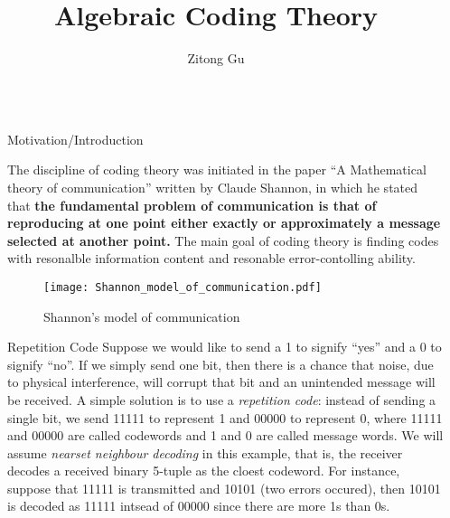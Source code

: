 \documentclass[final]{beamer}
\title{Algebraic Coding Theory}
\author{Zitong Gu}
\institute[shortinst]{McMaster University}
\newlength{\sepwidth}
\newlength{\colwidth}
\newcommand{\separatorcolumn}{\begin{column}{\sepwidth}\end{column}}
\begin{document}
\begin{frame}[t]
\begin{columns}[t]
\separatorcolumn

\begin{column}{\colwidth}

  \begin{block}{Motivation/Introduction}

    The discipline of coding theory was initiated in the paper 
    ``A Mathematical theory of communication'' written by 
    Claude Shannon, in which he stated that \textbf{the fundamental problem of communication is that of reproducing at
    one point either exactly or approximately a message selected at
    another point.} The main goal of coding theory is finding codes with resonalble information content and resonable error-contolling ability.
    \begin{figure}[t]
      \centering
      \texttt{[image: Shannon\_model\_of\_communication.pdf]}
      \caption{Shannon's model of communication}
    \end{figure}
    \begin{exampleblock}{Repetition Code}
      Suppose we would like to send a 1 to signify ``yes'' and a 0 to signify ``no''.
    If we simply send one bit, then there is a chance that noise, due to physical interference, 
    will corrupt that bit and an unintended message will be received. A simple solution
    is to use a \textit{repetition code}: instead of sending a single bit, we send 11111 to represent
    1 and 00000 to represent 0, where 11111 and 00000 are called codewords and 1 and 0 are called message
    words. We will assume \textit{nearset neighbour decoding} in this example, that is, the receiver decodes
    a received binary 5-tuple as the cloest codeword. For instance, suppose that 11111 is transmitted
    and 10101 (two errors occured), then 10101 is decoded as 11111 intsead of 00000 since there are more
    1s than 0s.  
    \end{exampleblock}
  \end{block}


\end{column}
\end{columns}
\end{frame}
\end{document}
